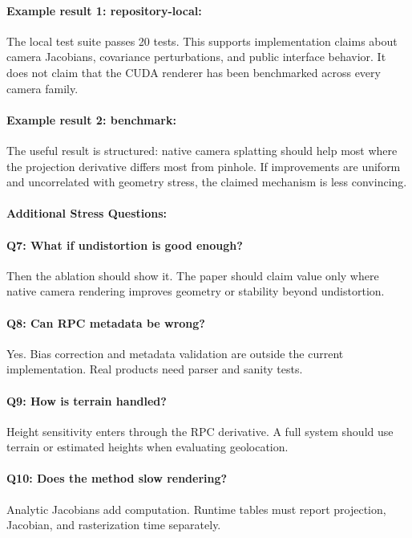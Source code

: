 \documentclass{article}
\begin{document}
\paragraph{Example result 1: repository-local:}
The local test suite passes 20 tests. This supports implementation claims about camera Jacobians, covariance perturbations, and public interface behavior. It does not claim that the CUDA renderer has been benchmarked across every camera family.

\paragraph{Example result 2: benchmark:}
The useful result is structured: native camera splatting should help most where the projection derivative differs most from pinhole. If improvements are uniform and uncorrelated with geometry stress, the claimed mechanism is less convincing.

\paragraph{Additional Stress Questions:}

\paragraph{Q7: What if undistortion is good enough?}
Then the ablation should show it. The paper should claim value only where native camera rendering improves geometry or stability beyond undistortion.

\paragraph{Q8: Can RPC metadata be wrong?}
Yes. Bias correction and metadata validation are outside the current implementation. Real products need parser and sanity tests.

\paragraph{Q9: How is terrain handled?}
Height sensitivity enters through the RPC derivative. A full system should use terrain or estimated heights when evaluating geolocation.

\paragraph{Q10: Does the method slow rendering?}
Analytic Jacobians add computation. Runtime tables must report projection, Jacobian, and rasterization time separately.
\end{document}
